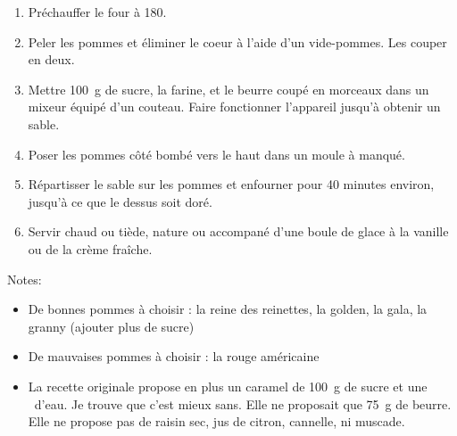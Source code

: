 
\begin{ingredients}
\end{ingredients}


\begin{recipe}
  \begin{enumerate}

  \item Préchauffer le four à 180\C.

  \item Peler les pommes et éliminer le coeur à l'aide d'un
    vide-pommes.  Les couper en deux.

  \item Mettre 100~g de sucre, la farine, et le beurre coupé en
    morceaux dans un mixeur équipé d'un couteau.  Faire
    fonctionner l'appareil jusqu'à obtenir un sable.

  \item Poser les pommes côté bombé vers le haut dans un moule à manqué.

  \item Répartisser le sable sur les pommes et enfourner pour 40
    minutes environ, jusqu'à ce que le dessus soit doré.

  \item Servir chaud ou tiède, nature ou accompané d'une boule de
    glace à la vanille ou de la crème fraîche.

  \end{enumerate}
\end{recipe}

Notes:
\begin{itemize}
\item De bonnes pommes à choisir : la reine des reinettes, la
  golden, la gala, la granny (ajouter plus de sucre)
\item De mauvaises pommes à choisir : la rouge américaine
\item La recette originale propose en plus un caramel de 100~g de
  sucre et une \ccf\ d'eau.  Je trouve que c'est mieux sans.  Elle ne
  proposait que 75~g de beurre.  Elle ne propose pas de raisin sec,
  jus de citron, cannelle, ni muscade.
\end{itemize}
